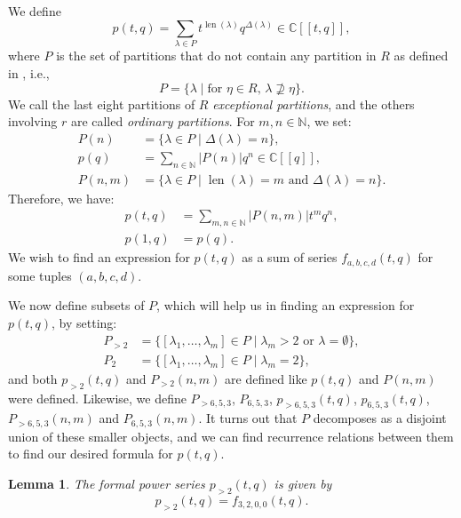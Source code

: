 \documentclass[a4paper, 12pt, reqno]{amsart}
\newtheorem{lemma}[theorem]{Lemma}
\theoremstyle{remark}
\DeclareMathOperator{\len}{len}
\begin{document}
We define
\begin{equation*}
  p(t, q) = \sum_{\lambda \in P}t^{\len(\lambda)}q^{\Delta(\lambda)} \in \mathbb{C}[[t, q]],
\end{equation*}
where $P$ is the set of partitions that do not contain any partition in $R$ as defined in , i.e.,
\begin{equation*}
  P = \{\lambda \mid \text{for $\eta \in R$, $\lambda \nsupseteq \eta$}\}.
\end{equation*}
We call the last eight partitions of $R$ \emph{exceptional partitions}, and the others involving $r$ are called \emph{ordinary partitions}.
For $m, n \in \mathbb{N}$, we set:
\begin{align*}
  P(n) &= \{\lambda \in P \mid \Delta(\lambda) = n\}, \\
  p(q) &= \sum_{n \in \mathbb{N}}|P(n)|q^n \in \mathbb{C}[[q]], \\
  P(n, m) &= \{\lambda \in P \mid \text{$\len(\lambda) = m$ and $\Delta(\lambda) = n$}\}.
\end{align*}
Therefore, we have:
\begin{align*}
  p(t, q) &= \sum_{m, n \in \mathbb{N}}|P(n, m)|t^mq^n, \\
  p(1, q) &= p(q).
\end{align*}
We wish to find an expression for $p(t, q)$ as a sum of series $f_{a, b, c, d}(t, q)$ for some tuples $(a, b, c, d)$.

We now define subsets of $P$, which will help us in finding an expression for $p(t, q)$, by setting:
\begin{align*}
  P_{>2} &= \{[\lambda_1, \dots, \lambda_m] \in P \mid \text{$\lambda_m > 2$ or $\lambda = \emptyset$}\}, \\
  P_2 &= \{[\lambda_1, \dots, \lambda_m] \in P \mid \lambda_m = 2\},
\end{align*}
and both $p_{>2}(t, q)$ and $P_{>2}(n, m)$ are defined like $p(t, q)$ and $P(n, m)$ were defined.
Likewise, we define $P_{>6, 5, 3}$, $P_{6, 5, 3}$, $p_{>6, 5, 3}(t, q)$, $p_{6, 5, 3}(t, q)$, $P_{>6, 5, 3}(n, m)$ and $P_{6, 5, 3}(n, m)$.
It turns out that $P$ decomposes as a disjoint union of these smaller objects, and we can find recurrence relations between them to find our desired formula for $p(t, q)$.

\begin{lemma}
  \label{lmm:30}
  The formal power series $p_{>2}(t, q)$ is given by
  \begin{equation*}
    p_{>2}(t, q) = f_{3, 2, 0, 0}(t, q).
  \end{equation*}
\end{lemma}
\end{document}
